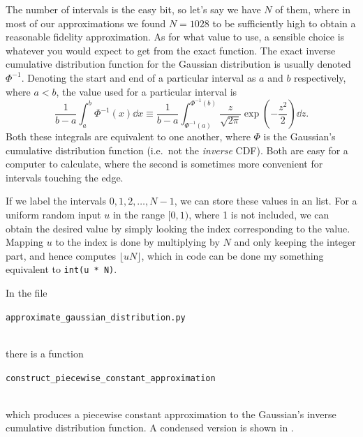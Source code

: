 \documentclass[11pt,a4paper,oneside,english]{extarticle}
\newcommand{\singlecodeline}[1]{\\[1em]\centerline{\lstinline[basicstyle=\ttfamily]$#1$}\\[1em]}
\begin{document}
The number of intervals is the easy bit, so let's say we have $ N $ of them, where in most of our approximations we found $ N = 1028 $ to be sufficiently high to obtain a reasonable fidelity approximation. As for what value to use, a sensible choice is whatever you would expect to get from the exact function. The exact inverse cumulative distribution function for the Gaussian distribution is usually denoted $ \Phi^{-1} $. Denoting the start and end of a particular interval as $ a $ and $ b $ respectively, where $ a < b $, the value used for a particular interval is
\begin{equation}
\dfrac{1}{b - a}\int_a^b \Phi^{-1}(x) \dd{x} \equiv \dfrac{1}{b - a} \int_{\Phi^{-1}(a)}^{\Phi^{-1}(b)} \dfrac{z}{\sqrt{2\pi}} \exp(-\dfrac{z^2}{2}) \dd{z}.
\end{equation}
Both these integrals are equivalent to one another, where $ \Phi $ is the Gaussian's cumulative distribution function (i.e.~not the \emph{inverse} CDF). Both are easy for a computer to calculate, where the second is sometimes more convenient for intervals touching the edge. 

If we label the intervals $ 0, 1, 2,\ldots, N-1 $, we can store these values in an list. For a uniform random input $ u $ in the range $ [0, 1) $, where 1 is not included, we can obtain the desired value by simply looking the index corresponding to the value. Mapping $ u $ to the index is done by multiplying by $ N $ and only keeping the integer part, and hence computes $ \lfloor u N \rfloor $, which in code can be done my something equivalent to \verb|int(u * N)|.

In the file \singlecodeline{approximate_gaussian_distribution.py} there is a function \singlecodeline{construct_piecewise_constant_approximation} which produces a piecewise constant approximation to the Gaussian's inverse cumulative distribution function. A condensed version is shown in .
\end{document}
